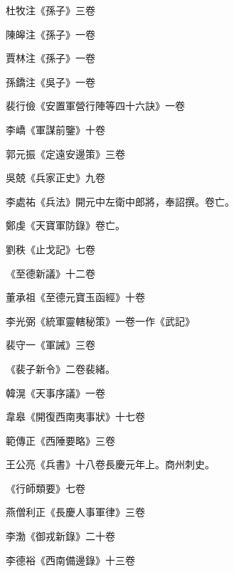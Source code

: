 \begin{pinyinscope}
 杜牧注《孫子》三卷



 陳皞注《孫子》一卷



 賈林注《孫子》一卷



 孫鐈注《吳子》一卷



 裴行儉《安置軍營行陣等四十六訣》一卷



 李嶠《軍謀前鑒》十卷



 郭元振《定遠安邊策》三卷



 吳兢《兵家正史》九卷



 李處祐《兵法》開元中左衛中郎將，奉詔撰。卷亡。



 鄭虔《天寶軍防錄》卷亡。



 劉秩《止戈記》七卷



 《至德新議》十二卷



 董承祖《至德元寶玉函經》十卷



 李光弼《統軍靈轄秘策》一卷一作《武記》



 裴守一《軍誡》三卷



 《裴子新令》二卷裴緒。



 韓滉《天事序議》一卷



 韋皋《開復西南夷事狀》十七卷



 範傳正《西陲要略》三卷



 王公亮《兵書》十八卷長慶元年上。商州刺史。



 《行師類要》七卷



 燕僧利正《長慶人事軍律》三卷



 李渤《御戎新錄》二十卷



 李德裕《西南備邊錄》十三卷




\end{pinyinscope}

